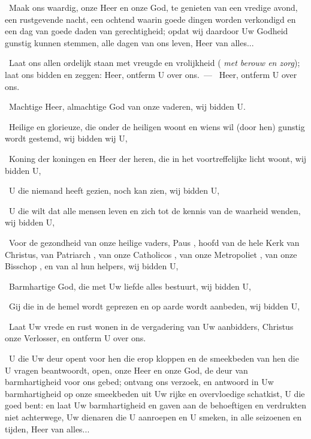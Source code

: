 \documentclass[12pt,twoside,a5paper]{article}
\begin{document}
\fullline
\begin{halfparskip}\begin{sfpar}
   

  \cc~Maak ons waardig, onze Heer en onze God, te genieten van een vredige avond, een rustgevende nacht, een ochtend waarin goede dingen worden verkondigd en een dag van goede daden van gerechtigheid; opdat wij daardoor Uw Godheid gunstig kunnen stemmen, alle dagen van ons leven, Heer van alles...


  \dd~Laat ons allen ordelijk staan met vreugde en vrolijkheid ( \emph{met berouw en zorg}); laat ons bidden en zeggen: Heer, ontferm U over ons.~--- \rr~Heer, ontferm U over ons. 

  \dd~Machtige Heer, almachtige God van onze vaderen, wij bidden U.

  \dd~Heilige en glorieuze, die onder de heiligen woont en wiens wil (door hen) gunstig wordt gestemd, wij bidden wij U,

  \dd~Koning der koningen en Heer der heren, die in het voortreffelijke licht woont, wij bidden U,

  \dd~U die niemand heeft gezien, noch kan zien, wij bidden U,

  \dd~U die wilt dat alle mensen leven en zich tot de kennis van de waarheid wenden, wij bidden U,

  \dd~Voor de gezondheid van onze heilige vaders, Paus \NN , hoofd van de hele Kerk van Christus, van Patriarch \NN , van onze Catholicos \NN , van onze Metropoliet \NN , van onze Bisschop \NN , en van al hun helpers, wij bidden U,

  \dd~Barmhartige God, die met Uw liefde alles bestuurt, wij bidden U,

  \dd~Gij die in de hemel wordt geprezen en op aarde wordt aanbeden, wij bidden U,

  \dd~Laat Uw vrede en rust wonen in de vergadering van Uw aanbidders, Christus onze Verlosser, en ontferm U over ons.


  \cc~U die Uw deur opent voor hen die erop kloppen en de smeekbeden van hen die U vragen beantwoordt, open, onze Heer en onze God, de deur van barmhartigheid voor ons gebed; ontvang ons verzoek, en antwoord in Uw barmhartigheid op onze smeekbeden uit Uw rijke en overvloedige schatkist, U die goed bent: en laat Uw barmhartigheid en gaven aan de behoeftigen en verdrukten niet achterwege, Uw dienaren die U aanroepen en U smeken, in alle seizoenen en tijden, Heer van alles...


\end{sfpar}
\end{halfparskip}
\end{document}
